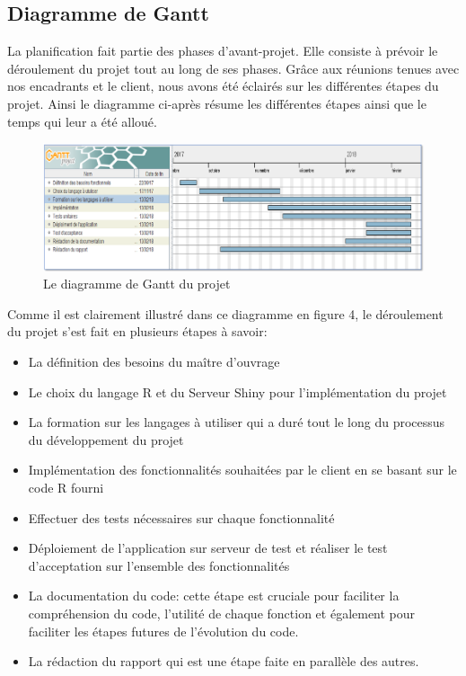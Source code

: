 	\subsection{Diagramme de Gantt}
	La planification fait partie des phases d’avant-projet. Elle consiste à prévoir le déroulement du projet tout au long de ses phases. Grâce aux réunions tenues avec nos encadrants et le client, nous avons été éclairés sur les différentes étapes du projet.
	Ainsi le diagramme ci-après résume les différentes étapes ainsi que le temps qui leur a été alloué.
	\newpage
\begin{figure}
	   \center
	   \includegraphics[scale=0.9]{img/diagramme_de_gantt.png}
	   \caption {Le diagramme de Gantt du projet}	
\end{figure}
	\newpage
   Comme il est clairement illustré dans ce diagramme en figure 4, le déroulement du projet s'est fait en plusieurs étapes à savoir:
 \begin{itemize}
\item La définition des besoins du maître d'ouvrage
\item Le choix du langage R et du Serveur Shiny pour l'implémentation du projet
\item La formation sur les langages à utiliser qui a duré tout le long du processus du développement du projet
\item Implémentation des fonctionnalités souhaitées par le client en se basant sur le code R fourni
\item Effectuer des tests nécessaires sur chaque fonctionnalité
\item Déploiement de l'application sur serveur de test et réaliser le test d'acceptation sur l'ensemble des fonctionnalités
\item La documentation du code: cette étape est cruciale pour faciliter la compréhension du code, l'utilité de chaque fonction et également pour faciliter les étapes futures  de l'évolution du code.
\item La rédaction du rapport qui est une étape faite en parallèle des autres.
 \end{itemize}